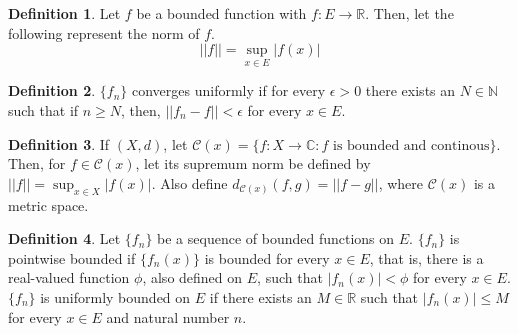 \documentclass[12pt]{article}
\theoremstyle{definition}
\newtheorem{definition}{Definition}
\theoremstyle{named}
\begin{document}
\renewcommand{\thedefinition}{6.1}
\begin{definition}
    Let $f$ be a bounded function with $f: E \to \mathbb{R}$. Then, let the following represent the norm of $f$. 
    $$
    ||f|| = \sup_{x \in E} |f(x)|
    $$
\end{definition}

\renewcommand{\thedefinition}{6.1}
\begin{definition}
    $\{f_n\}$ converges uniformly if for every $\epsilon > 0$ there exists an $N \in \mathbb{N}$ such that if $n \geq N$, then, $||f_n - f|| < \epsilon$ for every $x \in E$. 
\end{definition}

\renewcommand{\thedefinition}{6.1}
\begin{definition}
    If $(X,d)$, let $\mathscr{C}(x) = \{f: X \to \mathbb{C}: f \text{ is bounded and continous}\}$. Then, for $f \in \mathscr{C}(x)$, let its supremum norm be defined by $||f|| = \sup_{x \in X} |f(x)|$. Also define $d_{\mathscr{C}(x)} (f,g) = ||f-g||$, where $\mathscr{C}(x)$ is a metric space. 
\end{definition}

\renewcommand{\thedefinition}{6.1}
\begin{definition}
    Let $\{f_n\}$ be a sequence of bounded functions on $E$. $\{f_n\}$ is pointwise bounded if $\{f_n(x)\}$ is bounded for every $x \in E$, that is, there is a real-valued function $\phi$, also defined on $E$, such that $|f_n(x)| < \phi$ for every $x \in E$. $\{f_n\}$ is uniformly bounded on $E$ if there exists an $M \in \mathbb{R}$ such that $|f_n(x)| \leq M$ for every $x \in E$ and natural number $n$.  
\end{definition}
\end{document}
